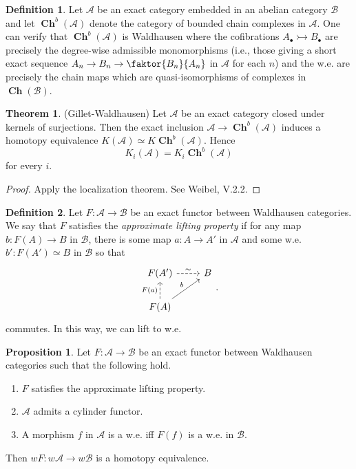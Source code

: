 \documentclass[10pt,letterpaper,cm]{nupset}
\theoremstyle{definition}
\newtheorem*{definition}{Definition}
\newtheorem{theorem}{Theorem}
\newtheorem{prop}{Proposition}
\newcommand{\1}{\mathbf{1}}
\renewcommand{\a}{\mathscr{A}}
\renewcommand{\b}{\mathscr{B}}
\newcommand{\0}{\vec 0}
\DeclareMathOperator{\ch}{\mathbf{Ch}}
\begin{document}
\begin{definition}
Let $\a$ be an exact category embedded in an abelian category $\b$ and let $\ch^b(\a)$ denote the category of bounded chain complexes in $\a$. One can verify that $\ch^b(\a)$ is Waldhausen where the cofibrations $A_{\bullet} \rightarrowtail B_{\bullet}$ are precisely the degree-wise admissible monomorphisms (i.e., those giving a short exact sequence $A_n \to B_n \to \faktor{B_n}{A_n}$ in $\a$ for each $n$) and the w.e. are precisely the chain maps which are quasi-isomorphisms of complexes in $\ch(\b)$.
\end{definition}

\begin{theorem}{(Gillet-Waldhausen)}
Let $\a$ be an exact category closed under kernels of surjections. Then the exact inclusion $\a \to \ch^b(\a)$ induces a homotopy equivalence $K(\a) \simeq K\ch^b(\a)$. Hence $$K_i(\a) = K_i \ch^b(\a)$$ for every $i$.
\end{theorem}
\begin{proof}
Apply the localization theorem. See Weibel, V.2.2.
\end{proof}

\begin{definition}
Let $F: \a \to \b$ be an exact functor between Waldhausen categories. We say that $F$ satisfies the \textit{approximate lifting property} if for any map $b: F(A) \to B$ in $\b$, there is some map $a : A \to A'$ in $\a$ and some w.e. $b' : F(A') \simeq B$ in $\b$ so that
\[
\begin{tikzcd}
F(A') \arrow[r, "\sim", dashed] & B \\
F(A) \arrow[u, "F(a)", dashed] \arrow[ru, "b"] & 
\end{tikzcd}.
\]
commutes. In this way, we can lift to w.e.
\end{definition}

\begin{prop}
Let $F: \a \to \b$ be an exact functor between Waldhausen categories such that the following hold.
\begin{enumerate}
\item $F$ satisfies the approximate lifting property.
\item $\a$ admits a cylinder functor.
\item A morphism $f$ in $\a$ is a w.e. iff $F(f)$ is a w.e. in $\b$.
\end{enumerate}
Then $wF : w \a \to w\b$ is a homotopy equivalence.
\end{prop}
\end{document}
